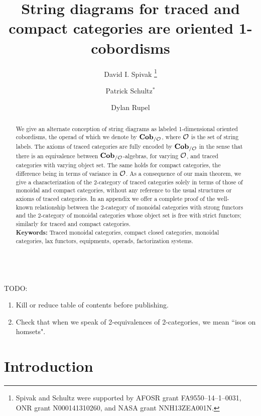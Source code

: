 \documentclass[11pt,oneside,article]{memoir}
\title{String diagrams for traced and compact categories are oriented 1-cobordisms}
\author{
   David I. Spivak%
      \thanks{Spivak and Schultz were supported by AFOSR grant FA9550--14--1--0031, ONR grant N000141310260, and NASA grant NNH13ZEA001N.}
   \and Patrick Schultz${}^*$%
   \and Dylan Rupel
}
\date{\vspace{-3ex}}
\begin{document}
\firmlists*

\maketitle
\begin{abstract}
   We give an alternate conception of string diagrams as labeled 1-dimensional oriented cobordisms,
   the operad of which we denote by $\mathbf{Cob}_{/\mathcal{O}}$, where $\mathcal{O}$ is the set of string labels.
   The axioms of traced categories are fully encoded by $\mathbf{Cob}_{/\mathcal{O}}$ in the sense that there is
   an equivalence between $\mathbf{Cob}_{/\mathcal{O}}$-algebras, for varying $\mathcal{O}$, and traced categories
   with varying object set. The same holds for compact categories, the difference being in terms of
   variance in $\mathcal{O}$. As a consequence of our main theorem, we give a characterization of the 2-category of traced categories solely in terms of those of monoidal and compact categories, without any reference to the usual structures or axioms of traced categories. In an appendix we offer a complete proof of the well-known relationship between the 2-category of monoidal categories with strong functors and the 2-category of monoidal categories whose object set is free with strict functors; similarly for traced and compact categories. \\

   \noindent\textbf{Keywords:} Traced monoidal categories, compact closed categories, monoidal categories, lax functors, equipments, operads, factorization systems.
\end{abstract}

~\\
TODO:
\begin{enumerate}
\item Kill or reduce table of contents before publishing.
\item Check that when we speak of 2-equivalences of 2-categories, we mean ``isos on homsets".
\end{enumerate}

\tableofcontents

\chapter{Introduction}\label{chap:intro}
\end{document}
